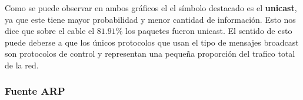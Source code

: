 \begin{figure}[hp!]
	\begin{minipage}[b]{0.9\linewidth}
	\end{minipage}
\end{figure}


Como se puede observar en ambos gráficos el el símbolo destacado es el
\textbf{unicast}, ya que este tiene mayor probabilidad y menor cantidad de
información. Esto nos dice que sobre el cable el $81.91\%$ los
paquetes fueron unicast.  El sentido de esto puede deberse a que los únicos
protocolos que usan el tipo de mensajes broadcast son protocolos de control y
representan una pequeña proporción del trafico total de la red.

\subsubsection{Fuente ARP}

